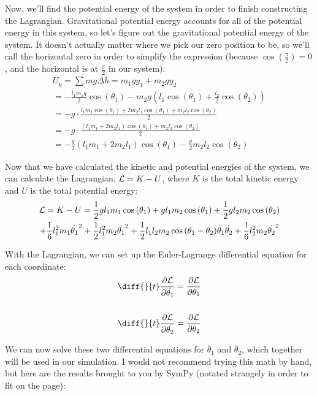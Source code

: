 \documentclass[]{article}
\begin{document}
Now, we'll find the potential energy of the system in order to finish constructing the Lagrangian. Gravitational potential energy accounts for all of the potential energy in this system, so let's figure out the gravitational potential energy of the system. It doesn't actually matter where we pick our zero position to be, so we'll call the horizontal zero in order to simplify the expression (because $\cos(\frac{\pi}{2}) = 0$, and the horizontal is at $\frac{\pi}{2}$ in our system):
\begin{gather*}
	U_g = \sum mg\Delta h = m_1gy_1 + m_2gy_2 \\
	= -\frac{l_1m_1g}{2}\cos(\theta_1) - m_2g(l_1\cos(\theta_1) + \frac{l_2}{2}\cos(\theta_2)) \\
	= -g\cdot\frac{l_1m_1\cos(\theta_1) + 2m_2l_1\cos(\theta_1) + m_2l_2\cos(\theta_2)}{2} \\
	= -g\cdot\frac{(l_1m_1 + 2m_2l_1)\cos(\theta_1) + m_2l_2\cos(\theta_2)}{2} \\
	= -\frac{g}{2}(l_1m_1 + 2m_2l_1)\cos(\theta_1) - \frac{g}{2}m_2l_2\cos(\theta_2)
\end{gather*}

Now that we have calculated the kinetic and potential energies of the system, we can calculate the Lagrangian, $\mathcal{L} = K - U$, where $K$ is the total kinetic energy and $U$ is the total potential energy:
\begin{gather*}
	\mathcal{L} = K - U = \frac{1}{2}g l_1  m_1 \cos{ (\theta_1  )} + g l_1 m_2 \cos{ (\theta_1  )} + \frac{1}{2}g l_2  m_2 \cos{ (\theta_2  )} \\ + \frac{1}{6}l_1^2 m_1  \dot{\theta_1}^2 + \frac{1}{2}l_1^2 m_2  \dot{\theta_1}^2 + \frac{1}{2}l_1 l_2  m_2 \cos{ (\theta_1 - \theta_2  )} \dot{\theta_1} \dot{\theta_2} + \frac{1}{6}l_2^2 m_2  \dot{\theta_2}^2
\end{gather*}

With the Lagrangian, we can set up the Euler-Lagrange differential equation for each coordinate:
\begin{gather*}
	\diff{}{t}\frac{\partial \lagr}{\partial \dot{\theta_1}} = \frac{\partial \lagr}{\partial \theta_1} \\ \\
	\diff{}{t}\frac{\partial \lagr}{\partial \dot{\theta_2}} = \frac{\partial \lagr}{\partial \theta_2}
\end{gather*}

We can now solve these two differential equations for $\ddot{\theta_1}$ and $\ddot{\theta_2}$, which together will be used in our simulation. I would not recommend trying this math by hand, but here are the results brought to you by SymPy (notated strangely in order to fit on the page):
\end{document}
